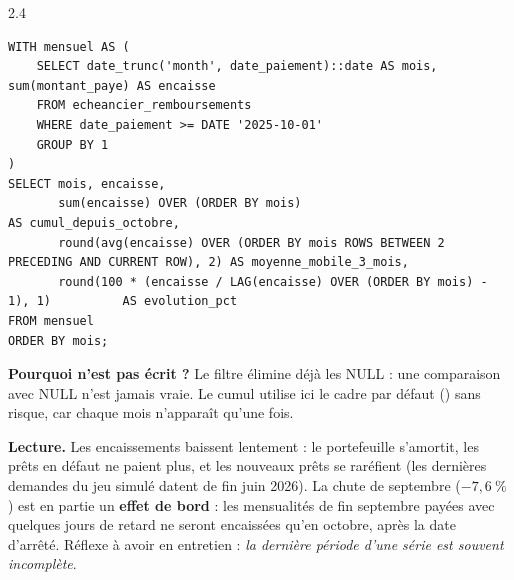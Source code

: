 \begin{correction}{2.4}
\begin{lstlisting}[style=long]
WITH mensuel AS (
    SELECT date_trunc('month', date_paiement)::date AS mois, sum(montant_paye) AS encaisse
    FROM echeancier_remboursements
    WHERE date_paiement >= DATE '2025-10-01'
    GROUP BY 1
)
SELECT mois, encaisse,
       sum(encaisse) OVER (ORDER BY mois)                                           AS cumul_depuis_octobre,
       round(avg(encaisse) OVER (ORDER BY mois ROWS BETWEEN 2 PRECEDING AND CURRENT ROW), 2) AS moyenne_mobile_3_mois,
       round(100 * (encaisse / LAG(encaisse) OVER (ORDER BY mois) - 1), 1)          AS evolution_pct
FROM mensuel
ORDER BY mois;
\end{lstlisting}

\textbf{Pourquoi  n'est pas écrit ?} Le filtre 
élimine déjà les NULL : une comparaison avec NULL n'est jamais vraie. Le cumul utilise ici le cadre par
défaut () sans risque, car chaque mois n'apparaît qu'une fois.

\begin{center}
\centering
{}
\label{fig:encaissements}
\end{center}

\textbf{Lecture.} Les encaissements baissent lentement : le portefeuille s'amortit, les prêts en
défaut ne paient plus, et les nouveaux prêts se raréfient (les dernières demandes du jeu simulé datent de fin
juin 2026). La chute de septembre ($-7{,}6~\%$) est en partie un \textbf{effet de bord} : les
mensualités de fin septembre payées avec quelques jours de retard ne seront encaissées qu'en octobre,
après la date d'arrêté. Réflexe à avoir en entretien : \emph{la dernière période d'une série est souvent
incomplète}.
\end{correction}

